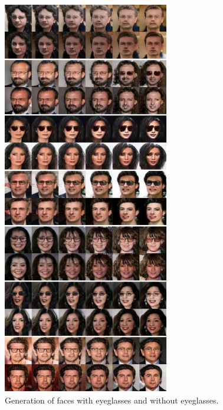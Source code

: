 \begin{figure}[thb!]
\centering
\includegraphics[trim=0in 0in 0in 0in, width=0.65\textwidth]{result_face_eyeglasses_big2.pdf}
\caption{Generation of faces with eyeglasses and without eyeglasses.}
\label{fig::result_eyeglass2}
\end{figure}
